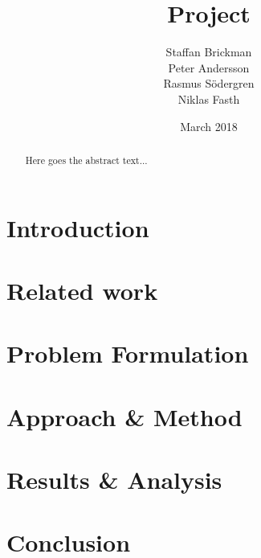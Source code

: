 \documentclass{article}
\title{Project}
\author{Staffan Brickman\\
Peter Andersson\\
Rasmus Södergren\\
Niklas Fasth}
\date{March 2018}
\begin{document}

\begin{abstract}
    Here goes the abstract text...
\end{abstract}
\section{Introduction}

\section{Related work}

\section{Problem Formulation}

\section{Approach \& Method}

\section{Results \& Analysis}

\section{Conclusion}



\printbibliography
\end{document}

